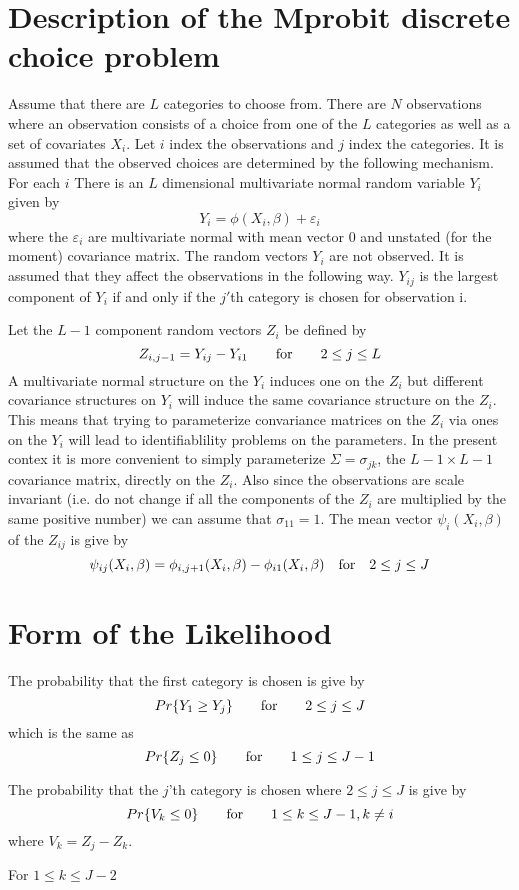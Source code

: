 %
%

%
%
\section{Description of the Mprobit discrete choice problem}
Assume that there are $L$ categories to choose from. There are $N$
observations where an observation consists of a choice from one of the
$L$ categories as well as a set of covariates $X_i$. 
Let $i$ index the observations and 
$j$ index the categories. It is assumed that
the observed choices are determined by the following mechanism.
For each $i$  There is an $L$ dimensional
 multivariate normal random variable 
$Y_i$ given by
$$Y_i=\phi(X_i,\beta) +\varepsilon_i$$ 
where the $\varepsilon_i$ are multivariate normal with mean vector $0$
and unstated (for the moment) covariance matrix.
The random vectors $Y_i$ are not observed. It is assumed that
they affect the observations in the following way.
$Y_{ij}$ is the largest component of $Y_i$ if and only if
the $j'$th category is chosen for observation i.

Let the $L-1$ component random vectors $Z_i$ be defined by
$$Z_{i,j-1}=Y_{ij}-Y_{i1} \qquad\hbox{\rm for}\qquad 2\le j\le L$$
A multivariate normal structure on the $Y_i$ induces one on the
$Z_i$ but different covariance structures on $Y_i$ will induce the
same covariance structure on the $Z_i$.  This means that
trying to parameterize convariance matrices on the $Z_i$
via ones on the $Y_i$ will lead to identifiablility problems
on the parameters. In the present contex it is more convenient
to simply parameterize $\Sigma=\sigma_{jk}$,
the $L-1 \times L-1$ covariance matrix,
 directly
on the $Z_i$. Also since the observations are scale invariant
(i.e. do not change if all the components of the $Z_i$ are multiplied
by the same positive number) we can assume that  $\sigma_{11}=1$.
The mean vector $\psi_i(X_i,\beta)$ of the $Z_{ij}$ is give by
$$\psi_{ij}(X_i,\beta)=\phi_{i,j+1}(X_i,\beta)-\phi_{i1}(X_i,\beta)
 \quad \hbox{\rm for} \quad 2\le j\le J$$

\section{Form of the Likelihood}

The probability that the first category is chosen is give by 
$$Pr\{Y_1\ge Y_j\} \qquad \hbox{\rm for} \qquad 2\le j\le J$$
which is the same as 
$$Pr\{Z_j\le 0\} \qquad \hbox{\rm for} \qquad 1\le j\le J-1$$

The probability that the $j$'th  category is chosen where 
$2\le j\le J$ is  give by 
$$Pr\{V_k\le 0\} \qquad \hbox{\rm for} \qquad 1\le k\le J-1, 
  k\ne i$$
where $V_k=Z_j-Z_k$.

For $1\le k\le J-2$

